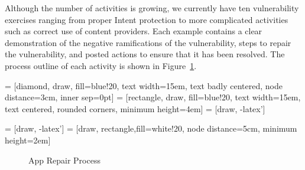 \documentclass[titlepage]{article}
\begin{document}

Although the number of activities is growing, we currently have ten vulnerability exercises ranging from proper Intent protection to more complicated activities such as correct use of content providers. Each example contains a clear demonstration of the negative ramifications of the vulnerability, steps to repair the vulnerability, and posted actions to ensure that it has been resolved. The process outline of each activity is shown in Figure~\ref{fig:AppRepairprocess}.


 = [diamond, draw, fill=blue!20,
    text width=15em, text badly centered, node distance=3cm, inner sep=0pt]
 = [rectangle, draw, fill=blue!20,
    text width=15em, text centered, rounded corners, minimum height=4em]
 = [draw, -latex']

\usetikzlibrary{shapes,arrows, positioning} %


 = [draw, -latex']
 = [draw, rectangle,fill=white!20, node distance=5cm, %
    minimum height=2em]

	\begin{figure}[h]
	\begin{center}

\caption{App Repair Process}
\label{fig:AppRepairprocess}
\end{center}
\end{figure}
\end{document}
